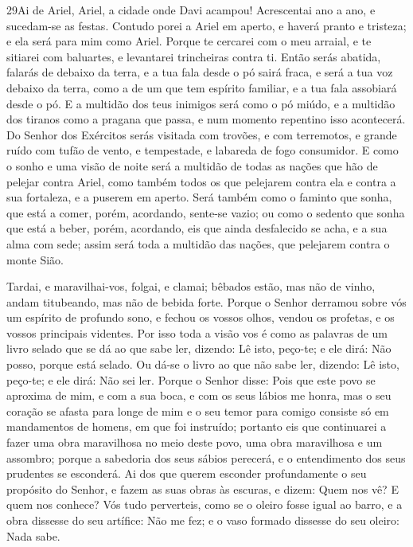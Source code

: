 \medskip

\lettrine{29}{}Ai de Ariel, Ariel, a cidade onde Davi acampou!
Acrescentai ano a ano, e sucedam-se as festas. Contudo porei a
Ariel em aperto, e haverá pranto e tristeza; e ela será para mim
como Ariel. Porque te cercarei com o meu arraial, e te sitiarei
com baluartes, e levantarei trincheiras contra ti. Então serás
abatida, falarás de debaixo da terra, e a tua fala desde o pó sairá
fraca, e será a tua voz debaixo da terra, como a de um que tem
espírito familiar, e a tua fala assobiará desde o pó. E a
multidão dos teus inimigos será como o pó miúdo, e a multidão dos
tiranos como a pragana que passa, e num momento repentino isso
acontecerá. Do Senhor dos Exércitos serás visitada com trovões,
e com terremotos, e grande ruído com tufão de vento, e tempestade, e
labareda de fogo consumidor. E como o sonho e uma visão de noite
será a multidão de todas as nações que hão de pelejar contra Ariel,
como também todos os que pelejarem contra ela e contra a sua
fortaleza, e a puserem em aperto. Será também como o faminto que
sonha, que está a comer, porém, acordando, sente-se vazio; ou como o
sedento que sonha que está a beber, porém, acordando, eis que ainda
desfalecido se acha, e a sua alma com sede; assim será toda a
multidão das nações, que pelejarem contra o monte Sião.

Tardai, e maravilhai-vos, folgai, e clamai; bêbados estão, mas não
de vinho, andam titubeando, mas não de bebida forte. Porque o
Senhor derramou sobre vós um espírito de profundo sono, e fechou os
vossos olhos, vendou os profetas, e os vossos principais videntes.
Por isso toda a visão vos é como as palavras de um livro
selado que se dá ao que sabe ler, dizendo: Lê isto, peço-te; e ele
dirá: Não posso, porque está selado. Ou dá-se o livro ao que
não sabe ler, dizendo: Lê isto, peço-te; e ele dirá: Não sei ler.
Porque o Senhor disse: Pois que este povo se aproxima de mim,
e com a sua boca, e com os seus lábios me honra, mas o seu coração
se afasta para longe de mim e o seu temor para comigo consiste só em
mandamentos de homens, em que foi instruído; portanto eis que
continuarei a fazer uma obra maravilhosa no meio deste povo, uma
obra maravilhosa e um assombro; porque a sabedoria dos seus sábios
perecerá, e o entendimento dos seus prudentes se esconderá.
Ai dos que querem esconder profundamente o seu propósito do
Senhor, e fazem as suas obras às escuras, e dizem: Quem nos vê? E
quem nos conhece? Vós tudo perverteis, como se o oleiro fosse
igual ao barro, e a obra dissesse do seu artífice: Não me fez; e o
vaso formado dissesse do seu oleiro: Nada sabe.

